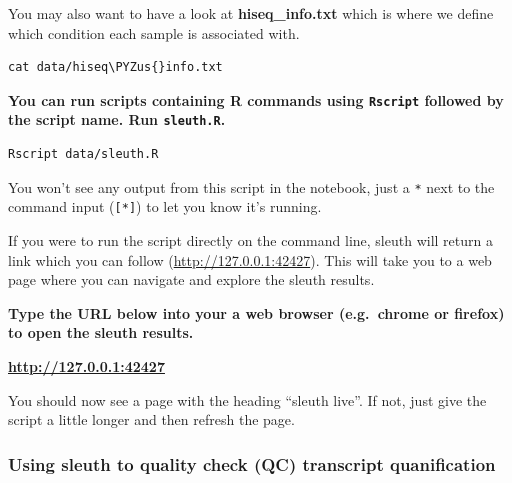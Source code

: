 \documentclass[11pt]{article}
\makeatletter
\def\PYZus{\char`\_}
\newcommand{\boxspacing}{\kern\kvtcb@left@rule\kern\kvtcb@boxsep}
\newcommand{\prompt}[4]{
        \ttfamily\llap{{\color{#2}[#3]:\hspace{3pt}#4}}\vspace{-\baselineskip}
    }
\makeatother
\begin{document}
    You may also want to have a look at \textbf{hiseq\_info.txt} which is
where we define which condition each sample is associated with.

    \begin{tcolorbox}[breakable, size=fbox, boxrule=1pt, pad at break*=1mm,colback=cellbackground, colframe=cellborder]
\prompt{In}{incolor}{ }{\boxspacing}
\begin{Verbatim}[commandchars=\\\{\}]
cat data/hiseq\PYZus{}info.txt
\end{Verbatim}
\end{tcolorbox}

    \textbf{You can run scripts containing R commands using \texttt{Rscript}
followed by the script name. Run \texttt{sleuth.R}.}

    \begin{tcolorbox}[breakable, size=fbox, boxrule=1pt, pad at break*=1mm,colback=cellbackground, colframe=cellborder]
\prompt{In}{incolor}{ }{\boxspacing}
\begin{Verbatim}[commandchars=\\\{\}]
Rscript data/sleuth.R
\end{Verbatim}
\end{tcolorbox}

    You won't see any output from this script in the notebook, just a
\texttt{*} next to the command input (\texttt{{[}*{]}}) to let you know
it's running.

If you were to run the script directly on the command line, sleuth will
return a link which you can follow (\url{http://127.0.0.1:42427}). This
will take you to a web page where you can navigate and explore the
sleuth results.

\textbf{Type the URL below into your a web browser (e.g.~chrome or
firefox) to open the sleuth results.}

\href{http://127.0.0.1:42427}{\textbf{http://127.0.0.1:42427}}

    You should now see a page with the heading ``sleuth live''. If not, just
give the script a little longer and then refresh the page.

\newpage

    \hypertarget{using-sleuth-to-quality-check-qc-transcript-quanification}{%
\subsubsection{Using sleuth to quality check (QC) transcript
quanification}\label{using-sleuth-to-quality-check-qc-transcript-quanification}}
\end{document}
